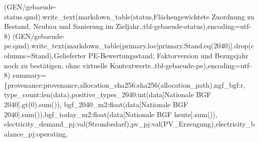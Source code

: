 \documentclass[
  ngerman,
  a4paper,
  DIV=11]{scrreprt}
\newenvironment{Shaded}{\begin{snugshade}}{\end{snugshade}}
\newcommand{\BuiltInTok}[1]{\textcolor[rgb]{0.00,0.23,0.31}{#1}}
\newcommand{\DecValTok}[1]{\textcolor[rgb]{0.68,0.00,0.00}{#1}}
\newcommand{\NormalTok}[1]{\textcolor[rgb]{0.00,0.23,0.31}{#1}}
\newcommand{\OperatorTok}[1]{\textcolor[rgb]{0.37,0.37,0.37}{#1}}
\newcommand{\StringTok}[1]{\textcolor[rgb]{0.13,0.47,0.30}{#1}}
\begin{document}
\begin{Shaded}
\begin{Highlighting}[]
\NormalTok{(GEN}\OperatorTok{/}\StringTok{\textquotesingle{}gebaeude{-}status.qmd\textquotesingle{}}\NormalTok{).write\_text(markdown\_table(status,}\StringTok{\textquotesingle{}Flächengewichtete Zuordnung zu Bestand, Neubau und Sanierung im Zieljahr.\textquotesingle{}}\NormalTok{,}\StringTok{\textquotesingle{}tbl{-}gebaeude{-}status\textquotesingle{}}\NormalTok{),encoding}\OperatorTok{=}\StringTok{\textquotesingle{}utf{-}8\textquotesingle{}}\NormalTok{)}
\NormalTok{(GEN}\OperatorTok{/}\StringTok{\textquotesingle{}gebaeude{-}pe.qmd\textquotesingle{}}\NormalTok{).write\_text(markdown\_table(primary.loc[primary.Stand.eq(}\StringTok{\textquotesingle{}2040\textquotesingle{}}\NormalTok{)].drop(columns}\OperatorTok{=}\StringTok{\textquotesingle{}Stand\textquotesingle{}}\NormalTok{),}\StringTok{\textquotesingle{}Gelieferter PE{-}Bewertungsstand; Faktorversion und Bezugsjahr noch zu bestätigen, ohne virtuelle Kontextwerte.\textquotesingle{}}\NormalTok{,}\StringTok{\textquotesingle{}tbl{-}gebaeude{-}pe\textquotesingle{}}\NormalTok{),encoding}\OperatorTok{=}\StringTok{\textquotesingle{}utf{-}8\textquotesingle{}}\NormalTok{)}
\NormalTok{summary}\OperatorTok{=}\NormalTok{\{}\StringTok{\textquotesingle{}provenance\textquotesingle{}}\NormalTok{:provenance,}\StringTok{\textquotesingle{}allocation\_sha256\textquotesingle{}}\NormalTok{:sha256(allocation\_path),}\StringTok{\textquotesingle{}ngf\_bgf\textquotesingle{}}\NormalTok{:r,}
 \StringTok{\textquotesingle{}type\_count\textquotesingle{}}\NormalTok{:}\BuiltInTok{len}\NormalTok{(data),}\StringTok{\textquotesingle{}positive\_types\_2040\textquotesingle{}}\NormalTok{:}\BuiltInTok{int}\NormalTok{(data[}\StringTok{\textquotesingle{}Nationale BGF 2040\textquotesingle{}}\NormalTok{].gt(}\DecValTok{0}\NormalTok{).}\BuiltInTok{sum}\NormalTok{()),}
 \StringTok{\textquotesingle{}bgf\_2040\_m2\textquotesingle{}}\NormalTok{:}\BuiltInTok{float}\NormalTok{(data[}\StringTok{\textquotesingle{}Nationale BGF 2040\textquotesingle{}}\NormalTok{].}\BuiltInTok{sum}\NormalTok{()),}\StringTok{\textquotesingle{}bgf\_today\_m2\textquotesingle{}}\NormalTok{:}\BuiltInTok{float}\NormalTok{(data[}\StringTok{\textquotesingle{}Nationale BGF heute\textquotesingle{}}\NormalTok{].}\BuiltInTok{sum}\NormalTok{()),}
 \StringTok{\textquotesingle{}electricity\_demand\_pj\textquotesingle{}}\NormalTok{:val(}\StringTok{\textquotesingle{}Strombedarf\textquotesingle{}}\NormalTok{),}\StringTok{\textquotesingle{}pv\_pj\textquotesingle{}}\NormalTok{:val(}\StringTok{\textquotesingle{}PV\_Erzeugung\textquotesingle{}}\NormalTok{),}\StringTok{\textquotesingle{}electricity\_balance\_pj\textquotesingle{}}\NormalTok{:operating,}

\end{Highlighting}
\end{Shaded}
\end{document}

